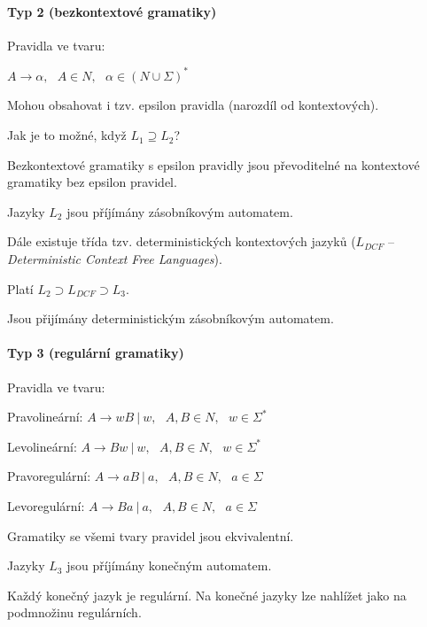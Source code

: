 \paragraph*{Typ 2 (bezkontextové gramatiky)} \begin{compactitem}
    \item Pravidla ve tvaru: \begin{compactitem}
        \item $A \rightarrow \alpha,~~~ A \in N,~~~ \alpha \in (N \cup \Sigma)^*$
        \item Mohou obsahovat i tzv. epsilon pravidla (narozdíl od kontextových).
        \item Jak je to možné, když $L_1 \supseteq L_2$?
        \item Bezkontextové gramatiky s epsilon pravidly jsou převoditelné na kontextové gramatiky bez epsilon pravidel.
    \end{compactitem}

    \item Jazyky $L_2$ jsou příjímány zásobníkovým automatem.

    \item Dále existuje třída tzv. deterministických kontextových jazyků ($L_{DCF}$ -- \textit{Deterministic Context Free Languages}). \begin{compactitem}
        \item Platí $L_2 \supset L_{DCF} \supset L_3$.
        \item Jsou přijímány deterministickým zásobníkovým automatem.
    \end{compactitem}
\end{compactitem}

\paragraph*{Typ 3 (regulární gramatiky)} \begin{compactitem}
    \item Pravidla ve tvaru: \begin{compactitem}
        \item Pravolineární: $A \rightarrow wB~|~w,~~~ A,B \in N,~~~ w \in \Sigma^*$

        \item Levolineární: $A \rightarrow Bw~|~w,~~~ A,B \in N,~~~ w \in \Sigma^*$

        \item Pravoregulární: $A \rightarrow aB~|~a,~~~ A,B \in N,~~~ a \in \Sigma$

        \item Levoregulární: $A \rightarrow Ba~|~a,~~~ A,B \in N,~~~ a \in \Sigma$
    \end{compactitem}

    \item Gramatiky se všemi tvary pravidel jsou ekvivalentní.

    \item Jazyky $L_3$ jsou příjímány konečným automatem.

    \item Každý konečný jazyk je regulární. Na konečné jazyky lze nahlížet jako na podmnožinu regulárních.
\end{compactitem}

